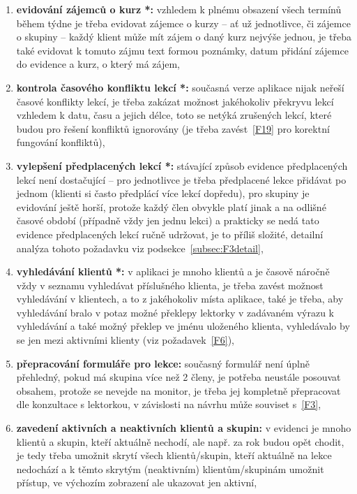 \begin{enumerate}[label=\textbf{F\arabic*}]
    \item \label{F1} \textbf{evidování zájemců o kurz *:} vzhledem k plnému obsazení všech termínů během týdne je třeba evidovat zájemce o kurzy -- ať už jednotlivce, či zájemce o skupiny -- každý klient může mít zájem o daný kurz nejvýše jednou, je třeba také evidovat k tomuto zájmu text formou poznámky, datum přidání zájemce do evidence a kurz, o který má zájem,
    \item \label{F2} \textbf{kontrola časového konfliktu lekcí *:} současná verze aplikace nijak neřeší časové konflikty lekcí, je třeba zakázat možnost jakéhokoliv překryvu lekcí vzhledem k datu, času a jejich délce, toto se netýká zrušených lekcí, které budou pro řešení konfliktů ignorovány (je třeba zavést~\ref{F19} pro korektní fungování konfliktů),
    \item \label{F3} \textbf{vylepšení předplacených lekcí *:} stávající způsob evidence předplacených lekcí není dostačující -- pro jednotlivce je třeba předplacené lekce přidávat po jednom (klienti si často předplácí více lekcí dopředu), pro skupiny je evidování ještě horší, protože každý člen obvykle platí jinak a na odlišné časové období (případně vždy jen jednu lekci) a prakticky se nedá tato evidence předplacených lekcí ručně udržovat, je to příliš složité, detailní analýza tohoto požadavku viz podsekce~\ref{subsec:F3detail},
    \item \label{F4} \textbf{vyhledávání klientů *:} v aplikaci je mnoho klientů a je časově náročně vždy v seznamu vyhledávat příslušného klienta, je třeba zavést možnost vyhledávání v klientech, a to z jakéhokoliv místa aplikace, také je třeba, aby vyhledávání bralo v potaz možné překlepy lektorky v zadávaném výrazu k vyhledávání a také možný překlep ve jménu uloženého klienta, vyhledávalo by se jen mezi aktivními klienty (viz požadavek~\ref{F6}),
    \item \label{F5} \textbf{přepracování formuláře pro lekce:} současný formulář není úplně přehledný, pokud má skupina více než 2 členy, je potřeba neustále posouvat obsahem, protože se nevejde na monitor, je třeba jej kompletně přepracovat dle konzultace s lektorkou, v závislosti na návrhu může souviset s~\ref{F3},
    \item \label{F6} \textbf{zavedení aktivních a neaktivních klientů a skupin:} v evidenci je mnoho klientů a skupin, kteří aktuálně nechodí, ale např. za rok budou opět chodit, je tedy třeba umožnit skrytí všech klientů/skupin, kteří aktuálně na lekce nedochází a k těmto skrytým (neaktivním) klientům/skupinám umožnit přístup, ve výchozím zobrazení ale ukazovat jen aktivní,

\end{enumerate}
